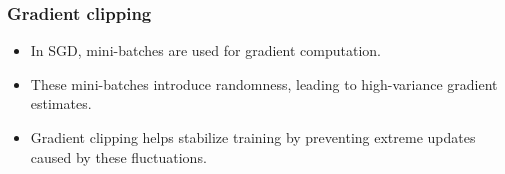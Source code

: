 \begin{frame}
    \frametitle{Gradient clipping}
    \begin{itemize}
        \item In SGD, mini-batches are used for gradient computation.
        \item These mini-batches introduce randomness, leading to high-variance gradient estimates.
        \item Gradient clipping helps stabilize training by preventing extreme updates caused by these fluctuations.
    \end{itemize}
\end{frame}
